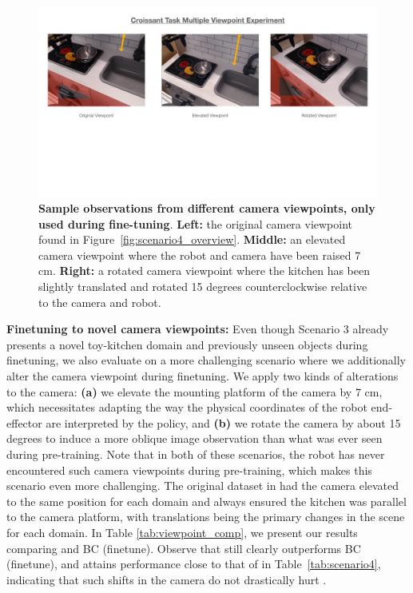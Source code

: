 \documentclass[../thesis.tex]{subfiles}
\begin{document}
\begin{figure}[h]
\vspace{-0.3cm}
\centering
  \includegraphics[width=0.9\linewidth]{chapters/ptr/MultViewpoint.pdf}
  \vspace{-0.3cm}
  \caption{\footnotesize \textbf{Sample observations from different camera viewpoints, only used during fine-tuning}. \textbf{Left:} the original camera viewpoint found in Figure~\ref{fig:scenario4_overview}. \textbf{Middle:} an elevated camera viewpoint where the robot and camera have been raised 7 cm. \textbf{Right:} a rotated camera viewpoint where the kitchen has been slightly translated and rotated 15 degrees counterclockwise relative to the camera and robot.}
  \label{fig:multviewpoint}
  \vspace{-0.2cm}
\end{figure}

\textbf{Finetuning to novel camera viewpoints:} Even though Scenario 3 already presents a novel toy-kitchen domain and previously unseen objects during finetuning, we also evaluate \ptrmethodname on a more challenging scenario where we additionally alter the camera viewpoint during finetuning. We apply two kinds of alterations to the camera: \textbf{(a)} we elevate the mounting platform of the camera by 7 cm, which necessitates adapting the way the physical coordinates of the robot end-effector are interpreted by the policy, and \textbf{(b)} we rotate the camera by about 15 degrees to induce a more oblique image observation than what was ever seen during pre-training. Note that in both of these scenarios, the robot has never encountered such camera viewpoints during pre-training, which makes this scenario even more challenging. The original dataset in \citep{ebert2021bridge} had the camera elevated to the same position for each domain and always ensured the kitchen was parallel to the camera platform, with translations being the primary changes in the scene for each domain. In Table \ref{tab:viewpoint_comp}, we present our results comparing \ptrmethodname and BC (finetune). Observe that \ptrmethodname still clearly outperforms BC (finetune), and attains performance close to that of \ptrmethodname in Table~\ref{tab:scenario4}, indicating that such shifts in the camera do not drastically hurt \ptrmethodname.
\end{document}
